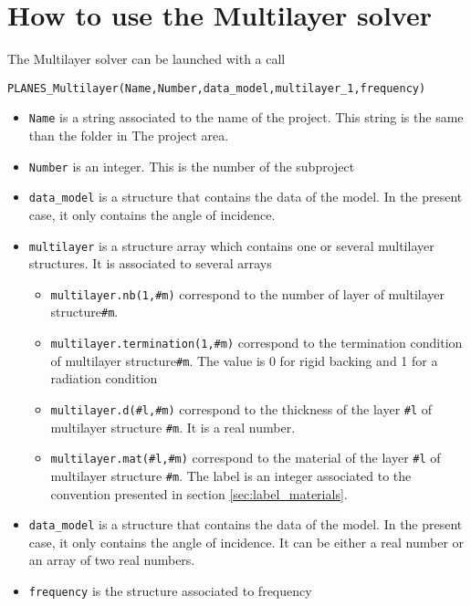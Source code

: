 \documentclass[11pt,A4paper]{book}
\renewcommand{\:}{\tb{:}}
\begin{document}
\chapter{How to use the Multilayer solver}


The Multilayer solver can be launched with a call

\begin{verbatim}PLANES_Multilayer(Name,Number,data_model,multilayer_1,frequency)
\end{verbatim}

\begin{itemize}
	\item \verb?Name? is a string associated to the name of the project. This string is the same than the folder in The project area.
	\item \verb?Number? is an integer. This is the number of the subproject
	\item \verb?data_model? is a structure that contains the data of the model. In the present case, it only contains the angle of incidence.
	\item \verb?multilayer? is a structure array which contains one or several multilayer structures. It is associated to several arrays
	\begin{itemize}
	\item \verb?multilayer.nb(1,#m)? correspond to the number of layer of multilayer structure\verb?#m?.
	\item \verb?multilayer.termination(1,#m)? correspond to the termination condition of multilayer structure\verb?#m?. The value is 0 for rigid backing and 1 for a radiation condition
	\item \verb?multilayer.d(#l,#m)? correspond to the thickness of the layer \verb?#l? of multilayer structure \verb?#m?. It is a real number.
	\item \verb?multilayer.mat(#l,#m)? correspond to the material of the layer \verb?#l? of multilayer structure \verb?#m?. The label is an integer associated to the convention presented in section \ref{sec:label_materials}.
	\end{itemize}
		\item \verb?data_model? is a structure that contains the data of the model. In the present case, it only contains the angle of incidence. It can be either a real number or an array of two real numbers. 
	\item  \verb?frequency? is the structure associated to frequency 
\end{itemize}
\end{document}
